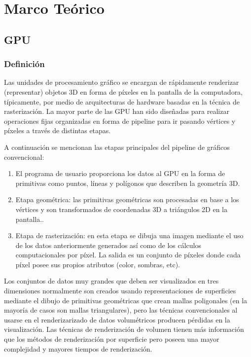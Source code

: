 \chapter{Marco Teórico}%

\section{GPU}
\subsection{Definición}

Las unidades de procesamiento gráfico se encargan de rápidamente renderizar (representar) objetos 3D en forma de píxeles en la pantalla de la computadora, típicamente, por medio de arquitecturas de hardware basadas en la técnica de rasterización. La mayor parte de las GPU han sido diseñadas para realizar operaciones fijas organizadas en forma de pipeline para ir pasando vértices y píxeles a través de distintas etapas.  

A continuación se mencionan las etapas principales del pipeline de gráficos convencional:
\begin{enumerate}

\item El programa de usuario proporciona los datos al GPU en la forma de primitivas como puntos, líneas y polígonos que describen la geometría 3D. 
\item Etapa geométrica: las primitivas geométricas son procesadas en base a los vértices y son transformados de coordenadas 3D a triángulos 2D en la pantalla.. 
\item Etapa de rasterización: en esta etapa se dibuja una imagen mediante el uso de los datos anteriormente generados así como de los cálculos computacionales por píxel. La salida es un conjunto de píxeles donde cada píxel posee sus propios atributos (color, sombras, etc).  

\end{enumerate}

Los conjuntos de datos muy grandes que deben ser visualizados en tres dimensiones normalmente son creados usando representaciones de superficies mediante el dibujo de primitivas geométricas que crean mallas poligonales (en la mayoría de casos son mallas triangulares), pero las técnicas convencionales al usarse en el renderizarizado de datos volumétricos producen pérdidas en la visualización. Las técnicas de  renderización de volumen tienen más información que los métodos de renderización por superficie pero poseen una mayor complejidad y mayores tiempos de renderización.


